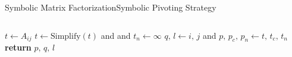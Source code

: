 \begin{frame}{Symbolic Matrix Factorization}{Symbolic Pivoting Strategy}
\begin{columns}
\begin{column}[c]{0.53\textwidth}
\begin{algorithmic}
            \State $t \gets A_{ij}$
            \State $t \gets \text{Simplify}(t)$ and  and $t_n \gets \infty$
              \State $q, \, l \gets i, \, j$ and $p, \, p_c, \, p_n \gets t, \, t_c, \, t_n$
            \EndIf
          \EndFor
          \State \textbf{return} $p, \, q, \, l$
        \EndProcedure
      \end{algorithmic}
    \end{column}
  \end{columns}
\end{frame}

